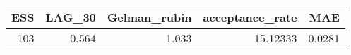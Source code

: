 \begin{longtable}{rrrrr}
\toprule
ESS & LAG\_30 & Gelman\_rubin & acceptance\_rate & MAE \\ 
\midrule
103 & 0.564 & 1.033 & 15.12333 & 0.0281 \\ 
\bottomrule
\end{longtable}

